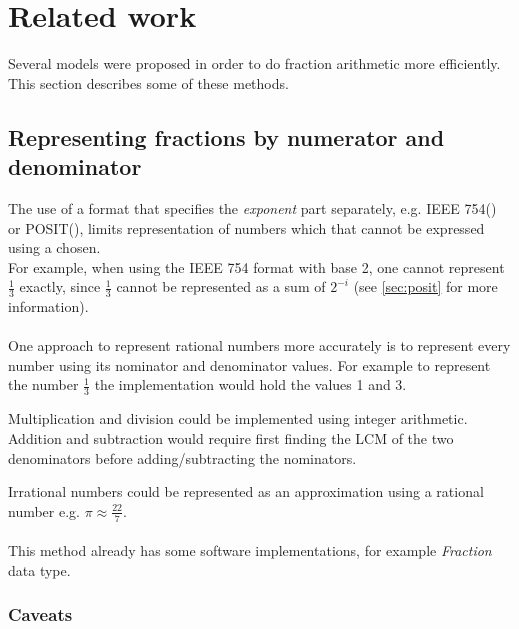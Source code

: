\documentclass[10pt]{article}
\begin{document}
\section{Related work}\label{sec:relatedwork}

Several models were proposed in order to do fraction arithmetic more efficiently.
This section describes some of these methods.

\subsection{Representing fractions by numerator and denominator}\label{sec:repr-fract-as}

The use of a format that specifies the \textit{exponent} part separately, e.g.
IEEE 754() or POSIT(), limits
representation of numbers which that cannot be expressed using a chosen.\\ For example,
when using the IEEE 754 format with base 2, one cannot represent $\frac{1}{3}$
exactly,  since $\frac{1}{3}$ cannot be represented as a sum of $2^{-i}$ (see
\autoref{sec:posit} for more information).

\paragraph{}
One approach to represent rational numbers more accurately is to represent every
number using its nominator and denominator values. For example to represent the
number $\frac{1}{3}$ the implementation would hold the values 1 and 3.

Multiplication and division could be implemented using integer arithmetic.
Addition and subtraction would require first finding the LCM of the two
denominators before adding/subtracting the nominators.

Irrational numbers could be represented as an approximation using a rational
number e.g. $\pi \approx \frac{22}{7}$.

\paragraph{}
This method already has some software implementations, for example
\textit{Fraction} data type.

\subsubsection{Caveats}\label{sec:caveats}
\end{document}
